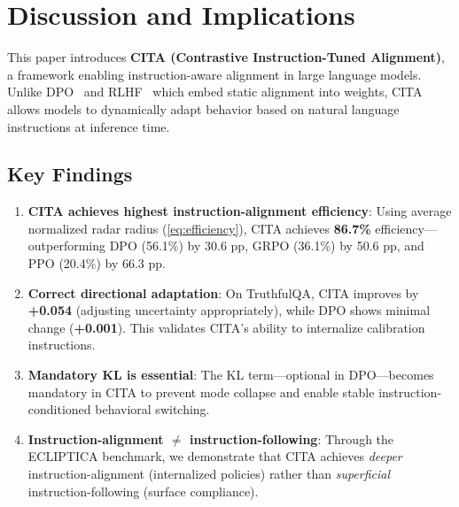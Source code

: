 
\vspace{-2mm}
\section{Discussion and Implications}
\label{sec:discussion}

This paper introduces \textbf{CITA (Contrastive Instruction-Tuned Alignment)}, a framework enabling instruction-aware alignment in large language models. Unlike DPO~\cite{rafailov2023direct} and RLHF~\cite{ouyang2022training} which embed static alignment into weights, CITA allows models to dynamically adapt behavior based on natural language instructions at inference time.

\vspace{-2mm}
\subsection{Key Findings}
\label{sec:key_findings}

\begin{enumerate}[leftmargin=*,itemsep=2pt]
    \item \textbf{CITA achieves highest instruction-alignment efficiency}: Using average normalized radar radius (\cref{eq:efficiency}), CITA achieves \textbf{86.7\%} efficiency---outperforming DPO (56.1\%) by 30.6 pp, GRPO (36.1\%) by 50.6 pp, and PPO (20.4\%) by 66.3 pp.

    \item \textbf{Correct directional adaptation}: On TruthfulQA, CITA improves by \textbf{+0.054} (adjusting uncertainty appropriately), while DPO shows minimal change (\textbf{+0.001}). This validates CITA's ability to internalize calibration instructions.

    \item \textbf{Mandatory KL is essential}: The KL term---optional in DPO---becomes mandatory in CITA to prevent mode collapse and enable stable instruction-conditioned behavioral switching.

    \item \textbf{Instruction-alignment $\neq$ instruction-following}: Through the ECLIPTICA benchmark, we demonstrate that CITA achieves \textit{deeper} instruction-alignment (internalized policies) rather than \textit{superficial} instruction-following (surface compliance).
\end{enumerate}

